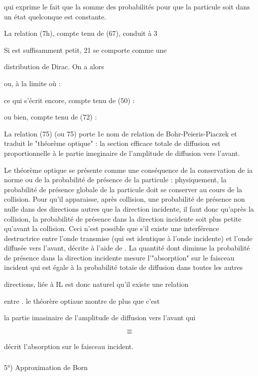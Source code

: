 qui exprime le fait que la somme des probabilités pour que la particule
soit dans un état  quelconque est constante.

La relation (7h), compte tenu de (67), conduit à 3

Si  est suffisamment petit, 21 se comporte comme une

distribution de Dirac. On a alors


ou, à la limite où  :

ce qui s'écrit encore, compte tenu de (50) :

ou bien, compte tenu de (72) :

La relation (75) (ou 75) porte 1e nom de relation de
Bohr-Peieris-Piaczek et traduit le "théorème optique" : la section
efficace totale de diffusion est proportionnelle à le partie imeginaire de
l'amplitude de diffusion vers l'avant.

Le théorème optique se présente comme une conséquence
de la conservation de ia norme ou de la probabilité de présence de la
particule : physiquement, la probabilité de présence globale de la particule
doit se conserver au cours de la collision. Pour qu'il apparaisse,
après collision, une probabilité de présence non nulle dans des directions
autres que la direction incidente, il faut donc qu'après la collision, la
probabilité de présence dans la direction incidente soit plus petite
qu'avant la collision. Ceci n'est possible que s'il existe une interférence
destructrice entre l'onde transmise (qui est identique à l'onde
incidente) et l'onde diffusée vers l'avant, décrite à l'aide de
. La quantité dont diminue la probabilité de présence dans la
direction incidente mesure l'"absorption" sur le faisceau incident qui
est égale à la probabilité totaïe de diffusion dans toutes les autres

directions, liée à  IL est donc naturel qu'il existe une relation

entre . le théorère optiaue montre de plus que c'est

la partie imasinaire de l'amplitude de diffusion vers l'avant  qui

\[
\tag{71}=
\]
\[
\tag{78}=
\]


décrit l'absorption sur le faisceau incident.

\subsubsection{}%
5°) Approximation de Born

